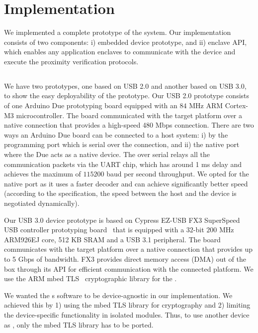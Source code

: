 \section{Implementation}
\label{sec:implementation}

We implemented a complete prototype of the \name system. Our implementation consists of two components: i) \device embedded device prototype, and ii) \name enclave API, which enables any application enclaves to communicate with the \device device and execute the proximity verification protocols.

\subsection{\device}

We have two prototypes, one based on USB 2.0 and another based on USB 3.0, to show the easy deployability of the prototype. Our USB 2.0 \device prototype consists of one Arduino Due prototyping board equipped with an $84$ MHz ARM Cortex-M3 microcontroller. The board communicated with the target platform over a native  connection that provides a high-speed 480 Mbps connection. There are two ways an Arduino Due board can be connected to a host system: i) by the programming port which is serial over the \usb connection, and ii) the native \usb port where the Due acts as a native \usb device. The \usb over serial relays all the communication packets via the UART chip, which has around 1 ms delay and achieves the maximum of $115200$ baud per second throughput. We opted for the native \usb port as it uses a faster  decoder and can achieve significantly better speed (according to the \usb specification, the speed between the host and the device is negotiated dynamically).


Our USB 3.0 device prototype is based on Cypress EZ-USB FX3 SuperSpeed USB controller prototyping board~\cite{fx3} that is equipped with a $32$-bit $200$ MHz ARM926EJ core, 512 KB SRAM and a USB 3.1 peripheral. The board communicates with the target platform over a native  connection that provides up to 5 Gbps of bandwidth. FX3 provides direct memory access (DMA) out of the box through its API for efficient communication with the connected platform. We use the ARM mbed TLS~\cite{mbed} cryptographic library for the \tls.

 We wanted the \device{}s software to be device-agnostic in our implementation. We achieved this by 1) using the mbed TLS library for cryptography and 2) limiting the device-specific functionality in isolated modules. Thus, to use another device as \device, only the mbed TLS library has to be ported.


